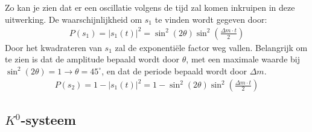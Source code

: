 \documentclass[../main.tex]{subfiles}
\begin{document}
Zo kan je zien dat er een oscillatie volgens de tijd zal komen inkruipen in deze uitwerking. De waarschijnlijkheid om $s_1$ te vinden wordt gegeven door:
\begin{equation}
    \begin{aligned}
        \label{eq:voorbeeld_osc_stable_massa_prob_1}
        P\left(s_{1}\right)=\left|s_{1}(t)\right|^{2}=\sin ^{2}(2 \theta) \sin ^{2}\left(\frac{\Delta m \cdot t}{2}\right)
    \end{aligned}
\end{equation}
Door het kwadrateren van $s_1$ zal de exponentiële factor weg vallen. Belangrijk om te zien is dat de amplitude bepaald wordt door $\theta$, met een maximale waarde bij $\sin^2(2\theta)=1 \rightarrow \theta=45^\circ$, en dat de periode bepaald wordt door $\Delta m$.
\begin{equation}
    \begin{aligned}
        \label{eq:voorbeeld_osc_stable_massa_prob_2}
        P\left(s_{2}\right)=1-\left|s_{1}(t)\right|^{2}=1-\sin ^{2}(2 \theta) \sin ^{2}\left(\frac{\Delta m \cdot t}{2}\right)
    \end{aligned}
\end{equation}

\subsection{$K^0$-systeem}%
\label{sub:_k_0_systeem}
\end{document}
